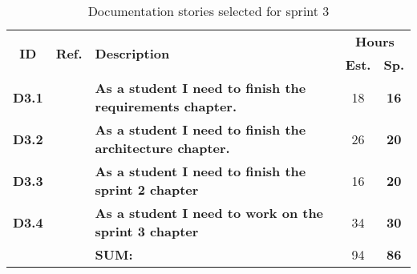  \def\arraystretch{1.25}
 
\begin{longtable}{ccXcc}
  \label{tab:sprint3Documentationstories}\\[-6mm]
\caption{Documentation stories selected for sprint 3}\\[-4mm]

\toprule[0.5mm]
\multirow{2}{*}{\textbf{ID}} &
\multirow{2}{*}{\textbf{Ref.}} & \multirow{2}{*}{\textbf{Description}} & \multicolumn{2}{c}{\textbf{Hours}} \\
 					& & & \textbf{Est.} & \textbf{Sp.} \\
\midrule

\textbf{D3.1} 	&   & {\bf As a student I need to finish the requirements chapter.} 			& 	18	& \textbf{ 16} \\

\textbf{D3.2} 	&   & {\bf As a student I need to finish the architecture chapter.} 			& 	26  & \textbf{ 20} \\
	
\textbf{D3.3} 	&	& {\bf As a student I need to finish the sprint 2 chapter} 					&   16  & \textbf{20} \\

\textbf{D3.4} 	&	& {\bf As a student I need to work on the sprint 3 chapter} 					& 	34  & \textbf{30} \\


\midrule
		
				&	& \textbf{SUM:}		&		94	& \textbf{86}
 \\																			
\bottomrule[0.5mm]
\end{longtable}
